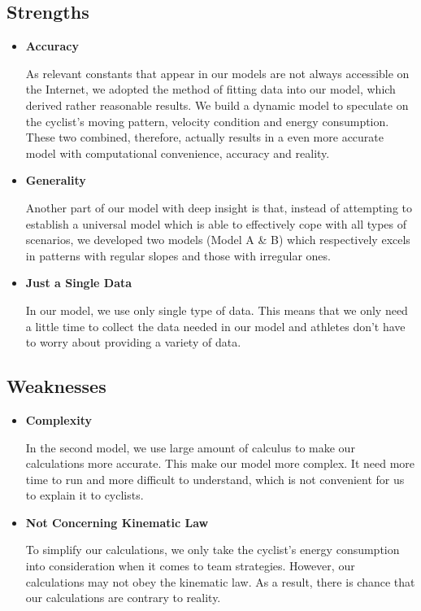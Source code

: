 \documentclass{article}
\begin{document}
		\subsection*{Strengths}
			\begin{itemize}
				\item\textbf{Accuracy}

					As relevant constants that appear in our models are not always accessible on the Internet, we adopted the method of fitting data into our model, which derived rather reasonable results. We build a dynamic model to speculate on the cyclist's moving pattern, velocity condition and energy consumption. These two combined, therefore, actually results in a even more accurate model with computational convenience, accuracy and reality.
				\item\textbf{Generality}

					Another part of our model with deep insight is that, instead of attempting to establish a universal model which is able to effectively cope with all types of scenarios, we developed two models (Model A \& B) which respectively excels in patterns with regular slopes and those with irregular ones.
				\item\textbf{Just a Single Data}

					In our model, we use only single type of data. This means that we only need a little time to collect the data needed in our model and athletes don't have to worry about providing a variety of data.
			\end{itemize}
		\subsection*{Weaknesses}

			\begin{itemize}
				\item\textbf{Complexity}

					In the second model, we use large amount of calculus to make our calculations more accurate. This make our model more complex. It need more time to run and more difficult to understand, which is not convenient for us to explain it to cyclists.
				\item\textbf{Not Concerning Kinematic Law}

					To simplify our calculations, we only take the cyclist's energy consumption into consideration when it comes to team strategies. However, our calculations may not obey the kinematic law. As a result, there is chance that our calculations are contrary to reality.

			\end{itemize}
	\newpage
\end{document}
